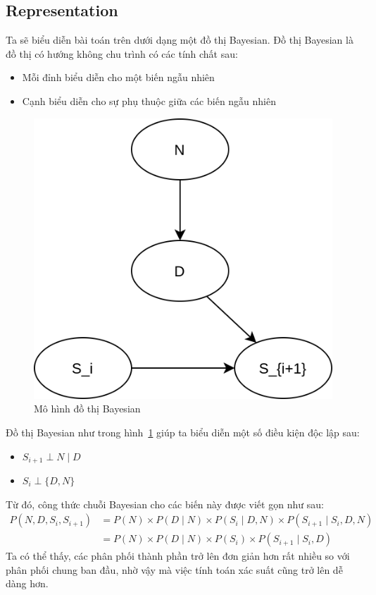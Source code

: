 \documentclass{my_style}
\begin{document}
\subsection{Representation}
Ta sẽ biểu diễn bài toán trên dưới dạng một đồ thị Bayesian.
Đồ thị Bayesian là đồ thị có hướng không chu trình có các tính chất sau: 
\begin{itemize}
	\item Mỗi đỉnh biểu diễn cho một biến ngẫu nhiên
	\item Cạnh biểu diễn cho sự phụ thuộc giữa các biến ngẫu nhiên 
\end{itemize}
\begin{figure}[h!]
	\centering
	\includegraphics[scale=1.0]{images/bayesian_network_1.png}
	\caption{Mô hình đồ thị Bayesian}
	\label{fig:bayesian}
\end{figure}
Đồ thị Bayesian như trong hình~\ref{fig:bayesian} giúp ta biểu diễn một số điều kiện độc lập sau: 
\begin{itemize}
	\item $S_{i+1} \perp N \mid D$
	\item $S_{i} \perp \{D, N\}$
\end{itemize}
Từ đó, công thức chuỗi Bayesian cho các biến này được viết gọn như sau: 
\begin{align*}
	P(N, D, S_{i}, S_{i+1}) &= P(N) \times P(D \mid N) \times P(S_{i} \mid D, N) \times P(S_{i+1} \mid S_{i}, D, N) \\
							&= P(N) \times P(D \mid N) \times P(S_{i}) \times P(S_{i+1} \mid S_{i}, D)
\end{align*}
Ta có thể thấy, các phân phối thành phần trở lên đơn giản hơn rất nhiều so với phân phối chung ban đầu, nhờ vậy mà việc tính toán xác suất cũng trở lên dễ dàng hơn. 
\end{document}
